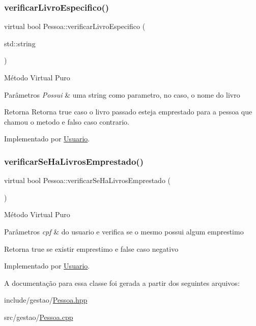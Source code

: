 \subsubsection{\texorpdfstring{verificarLivroEspecifico()}{verificarLivroEspecifico()}}
{\footnotesize\ttfamily virtual bool Pessoa\+::verificar\+Livro\+Especifico (\begin{DoxyParamCaption}\item[{std\+::string}]{ }\end{DoxyParamCaption})\hspace{0.3cm}{\ttfamily [pure virtual]}}

Método Virtual Puro 
\begin{DoxyParams}{Parâmetros}
{\em Possui} & uma string como parametro, no caso, o nome do livro \\
\hline
\end{DoxyParams}
\begin{DoxyReturn}{Retorna}
Retorna true caso o livro passado esteja emprestado para a pessoa que chamou o metodo e falso caso contrario. 
\end{DoxyReturn}


Implementado por \mbox{\hyperlink{class_usuario_a4924ca45ad5dfc728a1b42b5d796f276}{Usuario}}.

\mbox{\label{class_pessoa_a547989725eea2157a721541846091929}} 
\subsubsection{\texorpdfstring{verificarSeHaLivrosEmprestado()}{verificarSeHaLivrosEmprestado()}}
{\footnotesize\ttfamily virtual bool Pessoa\+::verificar\+Se\+Ha\+Livros\+Emprestado (\begin{DoxyParamCaption}{ }\end{DoxyParamCaption})\hspace{0.3cm}{\ttfamily [pure virtual]}}

Método Virtual Puro 
\begin{DoxyParams}{Parâmetros}
{\em cpf} & do usuario e verifica se o mesmo possui algum emprestimo \\
\hline
\end{DoxyParams}
\begin{DoxyReturn}{Retorna}
true se existir emprestimo e false caso negativo 
\end{DoxyReturn}


Implementado por \mbox{\hyperlink{class_usuario_a31278ae35c22cfd776023ac61fd7b936}{Usuario}}.



A documentação para essa classe foi gerada a partir dos seguintes arquivos\+:\begin{DoxyCompactItemize}
\item 
include/gestao/\mbox{\hyperlink{_pessoa_8hpp}{Pessoa.\+hpp}}\item 
src/gestao/\mbox{\hyperlink{_pessoa_8cpp}{Pessoa.\+cpp}}\end{DoxyCompactItemize}
